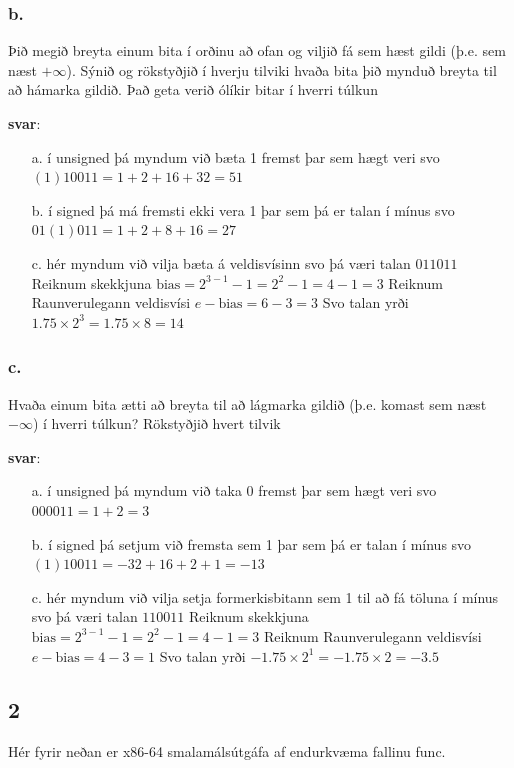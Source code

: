 \documentclass{article}
\begin{document}
\subsubsection{b.}Þið megið breyta einum bita í orðinu að ofan og viljið fá sem hæst gildi (þ.e.
sem næst $+\infty$). Sýnið og rökstyðjið í hverju tilviki hvaða bita þið mynduð
breyta til að hámarka gildið. Það geta verið ólíkir bitar í hverri túlkun

\textbf{svar}: 
\begin{itemize}
    \item[a.] í unsigned þá myndum við bæta 1 fremst þar sem hægt veri svo $(1)10011 = 1+2+16+32=51 $ 
    \item[b.] í signed þá má fremsti ekki vera 1 þar sem þá er talan í mínus svo $01(1)011 = 1+2+8+16 = 27$
    \item[c.] hér myndum við vilja bæta á veldisvísinn svo þá væri talan $0 110 11$ 
                Reiknum skekkjuna $\text{bias} = 2^{3-1} -1 = 2^2 -1 = 4-1 = 3$
                Reiknum Raunverulegann veldisvísi $e - \text{bias} =  6 - 3 = 3$
                Svo talan yrði $1.75 \times 2^3 = 1.75 \times 8 = 14$ 
\end{itemize}

\subsubsection{c.} Hvaða einum bita ætti að breyta til að lágmarka gildið (þ.e. komast sem næst
$-\infty$) í hverri túlkun? Rökstyðjið hvert tilvik

\textbf{svar}: 
\begin{itemize}
    \item[a.] í unsigned þá myndum við taka 0 fremst þar sem hægt veri svo $000011 = 1+2 = 3 $ 
    \item[b.] í signed þá setjum við fremsta sem 1 þar sem þá er talan í mínus svo $(1)10011 = -32 + 16+2+1  = -13$
    \item[c.] hér myndum við vilja setja formerkisbitann sem 1 til að fá töluna í mínus svo  þá væri talan $1 100 11$ 
                Reiknum skekkjuna $\text{bias} = 2^{3-1} -1 = 2^2 -1 = 4-1 = 3$
                Reiknum Raunverulegann veldisvísi $e - \text{bias} =  4 - 3 = 1$
                Svo talan yrði $-1.75 \times 2^1 = -1.75 \times 2 = -3.5$ 
\end{itemize}
\newpage 

\subsection{2}Hér fyrir neðan er x86-64 smalamálsútgáfa af endurkvæma fallinu func.
\end{document}
